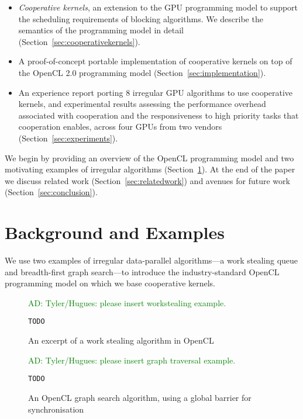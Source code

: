 \documentclass[nocopyrightspace]{sigplanconf-pldi16}
\newcommand{\ADComment}[1]{\textcolor{green}{AD: #1}}
\newcommand{\NumAlgorithms}{8}
\begin{document}
\begin{itemize}

\item \emph{Cooperative kernels}, an extension to the GPU programming model to support the scheduling requirements of blocking algorithms.  We describe the semantics of the programming model in detail (Section~\ref{sec:cooperativekernels}). 

\item A proof-of-concept portable implementation of cooperative
  kernels on top of the OpenCL 2.0 programming model
  (Section~\ref{sec:implementation}).

\item An experience report porting \NumAlgorithms{} irregular GPU
  algorithms to use cooperative kernels, and experimental results
  assessing the performance overhead associated with cooperation and
  the responsiveness to high priority tasks that cooperation enables,
  across four GPUs from two vendors (Section~\ref{sec:experiments}).

\end{itemize}

We begin by providing an overview of the OpenCL programming model and
two motivating examples of irregular algorithms (Section~\ref{sec:background}).  At the end of the paper we discuss related work (Section~\ref{sec:relatedwork}) and avenues for future work (Section~\ref{sec:conclusion}).

\section{Background and Examples}\label{sec:background}

We use two examples of irregular data-parallel algorithms---a work stealing queue and breadth-first graph
search---to introduce the industry-standard OpenCL programming model on which we base cooperative kernels.

\begin{figure}
\ADComment{Tyler/Hugues: please insert workstealing example.}
\begin{lstlisting}
TODO
\end{lstlisting}
\caption{An excerpt of a work stealing algorithm in OpenCL}\label{fig:workstealing}
\end{figure}

\begin{figure}
\ADComment{Tyler/Hugues: please insert graph traversal example.}
\begin{lstlisting}
TODO
\end{lstlisting}
\caption{An OpenCL graph search algorithm, using a global barrier for synchronisation}\label{fig:graphsearch}
\end{figure}
\end{document}

